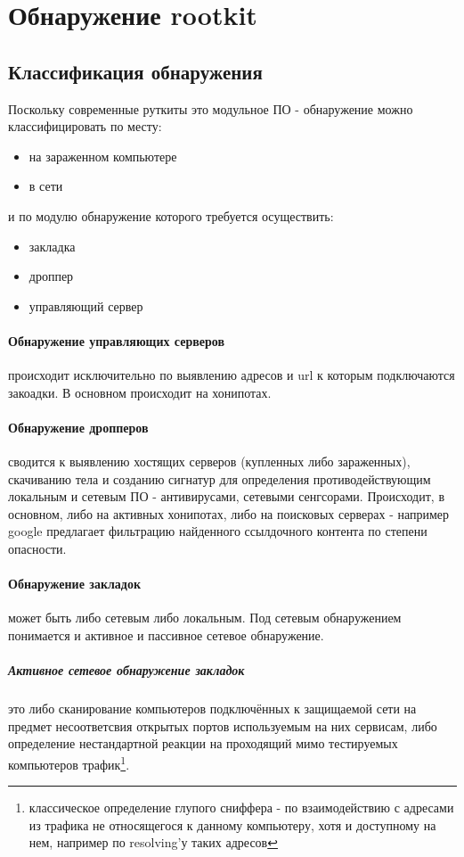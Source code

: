 \section{Обнаружение rootkit}
\label{section_rk_detection}
\subsection{Классификация обнаружения}

Поскольку современные руткиты это модульное ПО - обнаружение можно классифицировать по месту:
\begin{itemize}
\item{на зараженном компьютере}
\item{в сети}
\end{itemize}

и по модулю обнаружение которого требуется осуществить:
\begin{itemize}
\item{закладка}
\item{дроппер}
\item{управляющий сервер}
\end{itemize}

\paragraph{Обнаружение управляющих серверов} происходит исключительно по выявлению адресов и url к которым подключаются закоадки.
В основном происходит на хонипотах.

\paragraph{Обнаружение дропперов} сводится к выявлению хостящих серверов (купленных либо зараженных),
скачиванию тела и созданию сигнатур для определения противодействующим локальным и сетевым ПО -
антивирусами, сетевыми сенгсорами. Происходит, в основном, либо на активных хонипотах, либо на поисковых
серверах - например google предлагает фильтрацию найденного ссылдочного контента по степени опасности.

\paragraph{Обнаружение закладок} может быть либо сетевым либо локальным.
Под сетевым обнаружением понимается и активное и пассивное сетевое
обнаружение.

\subparagraph{Активное сетевое обнаружение закладок} это либо сканирование
компьютеров подключённых к защищаемой сети на предмет несоответсвия
открытых портов используемым на них сервисам, либо определение
нестандартной реакции на проходящий мимо тестируемых компьютеров
трафик\footnote{классическое определение глупого сниффера - по
взаимодействию с адресами  из трафика не относящегося к данному
компьютеру, хотя и доступному на нем, например по  resolving'у таких
адресов}.

